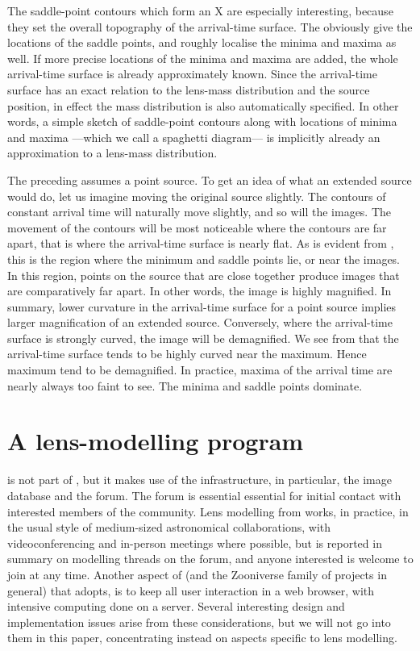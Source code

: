 The saddle-point contours which form an X are especially interesting,
because they set the overall topography of the arrival-time surface.
The obviously give the locations of the saddle points, and roughly
localise the minima and maxima as well.  If more precise locations of
the minima and maxima are added, the whole arrival-time surface is
already approximately known.  Since the arrival-time surface has an
exact relation to the lens-mass distribution and the source position,
in effect the mass distribution is also automatically specified.  In
other words, a simple sketch of saddle-point contours along with
locations of minima and maxima ---which we call a spaghetti diagram---
is implicitly already an approximation to a lens-mass distribution.

The preceding assumes a point source.  To get an idea of what an
extended source would do, let us imagine moving the original source
slightly.  The contours of constant arrival time will naturally move
slightly, and so will the images.  The movement of the contours will
be most noticeable where the contours are far apart, that is where the
arrival-time surface is nearly flat.  As is evident from
, this is the region where the minimum and saddle points
lie, or near the images.  In this region, points on the source that
are close together produce images that are comparatively far apart.
In other words, the image is highly magnified.  In summary, lower
curvature in the arrival-time surface for a point source implies
larger magnification of an extended source.  Conversely, where the
arrival-time surface is strongly curved, the image will be
demagnified.  We see from  that the arrival-time surface
tends to be highly curved near the maximum.  Hence maximum tend to be
demagnified.  In practice, maxima of the arrival time are nearly
always too faint to see. The minima and saddle points dominate.

\section{A lens-modelling program} \label{sec:SpaghettiLens}

\spl is not part of \sw, but it makes use of the \sw infrastructure,
in particular, the image database and the forum.  The forum is
essential essential for initial contact with interested members of the
\sw community.  Lens modelling from \sw works, in practice, in the
usual style of medium-sized astronomical collaborations, with
videoconferencing and in-person meetings where possible, but is
reported in summary on modelling threads on the forum, and anyone
interested is welcome to join at any time.  Another aspect of \sw (and
the Zooniverse family of projects in general) that \spl adopts, is to
keep all user interaction in a web browser, with intensive computing
done on a server.  Several interesting design and implementation
issues arise from these considerations, but we will not go into them
in this paper, concentrating instead on aspects specific to lens
modelling.

